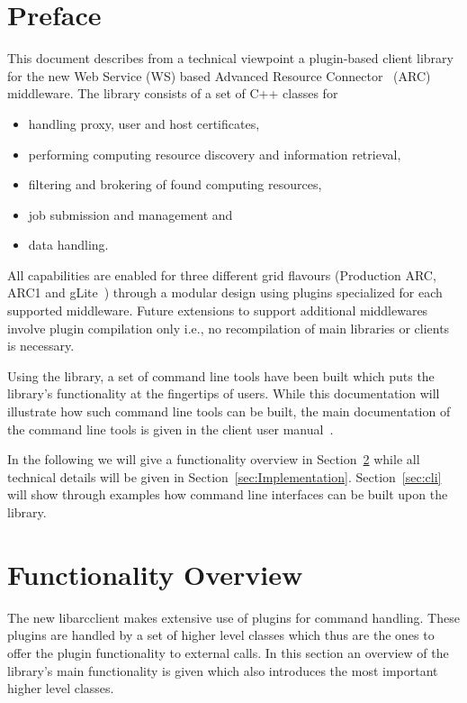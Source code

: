 \documentclass{book}
\newcommand{\libarcclient}{libarcclient}
\begin{document}
\tableofcontents                   %
\newpage
\chapter{Preface}
\label{sec:intro}

This document describes from a technical viewpoint a plugin-based
client library for the new Web Service (WS) based Advanced Resource
Connector~\cite{arc} (ARC) middleware. The library consists of a set
of C++ classes for

\begin{itemize}
\item{handling proxy, user and host certificates,}
\item{performing computing resource discovery and information retrieval,}
\item{filtering and brokering of found computing resources,}
\item{job submission and management and}
\item{data handling.}
\end{itemize}

All capabilities are enabled for three different grid flavours
(Production ARC, ARC1 and gLite~\cite{glite}) through a modular design
using plugins specialized for each supported middleware. Future
extensions to support additional middlewares involve plugin
compilation only i.e., no recompilation of main libraries or clients
is necessary.

Using the library, a set of command line tools have been built which
puts the library's functionality at the fingertips of users. While
this documentation will illustrate how such command line tools can be
built, the main documentation of the command line tools is given in
the client user manual~\cite{ui}.

In the following we will give a functionality overview in
Section~\ref{sec:FuncOver} while all technical details will be given
in Section~\ref{sec:Implementation}. Section~\ref{sec:cli} will
show through examples how command line interfaces can be built upon
the library.

\chapter{Functionality Overview}
\label{sec:FuncOver}

The new {\libarcclient} makes extensive use of plugins for command
handling. These plugins are handled by a set of higher level classes
which thus are the ones to offer the plugin functionality to external
calls. In this section an overview of the library's main functionality
is given which also introduces the most important higher level
classes.
\end{document}
